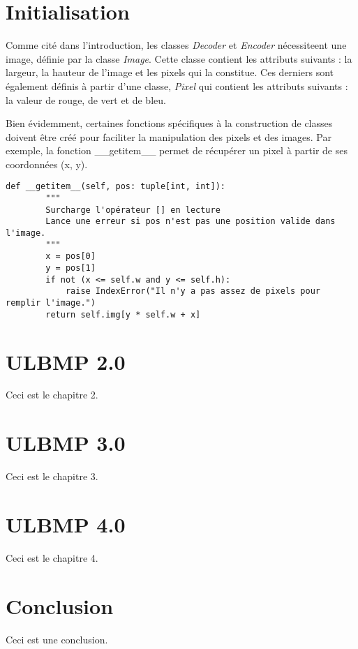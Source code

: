 \documentclass{report}
\begin{document}
\chapter{Initialisation}
Comme cité dans l'introduction, les classes \textit{Decoder} et \textit{Encoder} nécessiteent une image, définie par la classe \textit{Image}. Cette classe contient les attributs suivants : la largeur, la hauteur de l'image et les pixels qui la constitue. Ces derniers sont également définis à partir d'une classe, \textit{Pixel} qui contient les attributs suivants : la valeur de rouge, de vert et de bleu. 

Bien évidemment, certaines fonctions spécifiques à la construction de classes doivent être créé pour faciliter la manipulation des pixels et des images. Par exemple, la fonction __getitem__ permet de récupérer un pixel à partir de ses coordonnées (x, y).
\begin{lstlisting}
def __getitem__(self, pos: tuple[int, int]):
        """
        Surcharge l'opérateur [] en lecture
        Lance une erreur si pos n'est pas une position valide dans l'image.
        """
        x = pos[0]
        y = pos[1]
        if not (x <= self.w and y <= self.h):
            raise IndexError("Il n'y a pas assez de pixels pour remplir l'image.")
        return self.img[y * self.w + x]

\end{lstlisting}



\chapter{ULBMP 2.0}
Ceci est le chapitre 2.

\chapter{ULBMP 3.0}
Ceci est le chapitre 3.

\chapter{ULBMP 4.0}
Ceci est le chapitre 4.

\chapter{Conclusion}
Ceci est une conclusion.
\end{document}
